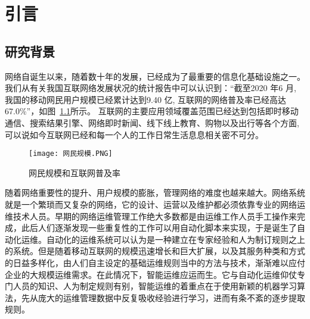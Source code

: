 
\chapter{引言}


\section{研究背景}

网络自诞生以来，随着数十年的发展，已经成为了最重要的信息化基础设施之一。我们从有关我国互联网络发展状况的统计报告\cite{cac.gov}中可以认识到：“截至2020 年6 月, 我国的移动网民用户规模已经累计达到9.40 亿, 互联网的网络普及率已经高达67.0\%”，如图~\ref{fig:网民规模和互联网普及率}所示。
互联网的主要应用领域覆盖范围已经达到包括即时移动通信、搜索结果引擎、网络即时新闻、线下线上教育、购物以及出行等各个方面,可以说如今互联网已经和每一个人的工作日常生活息息相关密不可分。



\begin{figure}
    \centering
    \texttt{[image: 网民规模.PNG]}
    \caption{网民规模和互联网普及率}
    \label{fig:网民规模和互联网普及率}
  \end{figure}

随着网络重要性的提升、用户规模的膨胀，管理网络的难度也越来越大。网络系统就是一个繁琐而又复杂的网络，它的设计、运营以及维护都必须依靠专业的网络运维技术人员。早期的网络运维管理工作绝大多数都是由运维工作人员手工操作来完成，此后人们逐渐发现一些重复性的工作可以用自动化脚本来实现，于是诞生了自动化运维。自动化的运维系统可以认为是一种建立在专家经验和人为制订规则之上的系统。但是随着移动互联网的规模迅速增长和巨大扩展，以及其服务种类和方式的日益多样化，由人们自主设定的基础运维规则当中的方法与技术，渐渐难以应付企业的大规模运维需求。在此情况下，智能运维应运而生。它与自动化运维仰仗专门人员的知识、人为制定规则有别，智能运维的着重点在于使用新颖的机器学习算法，先从庞大的运维管理数据中反复吸收经验进行学习，进而有条不紊的逐步提取规则。


